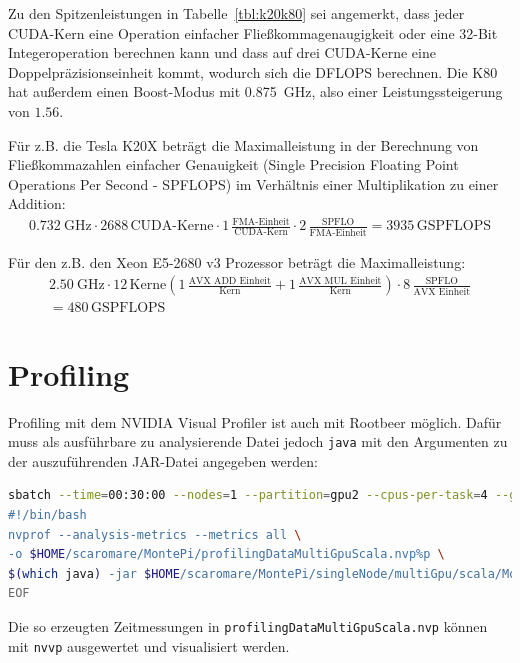 Zu den Spitzenleistungen in Tabelle~\ref{tbl:k20k80} sei angemerkt, dass jeder CUDA-Kern eine Operation einfacher Fließkommagenaugigkeit oder eine 32-Bit Integeroperation berechnen kann und dass auf drei CUDA-Kerne eine Doppelpräzisionseinheit kommt, wodurch sich die DFLOPS berechnen.
Die K80 hat außerdem einen Boost-Modus mit \SI{0.875}{\giga\hertz}, also einer Leistungssteigerung von $1.56$.

Für z.B. die Tesla K20X beträgt die Maximalleistung in der Berechnung von Fließkommazahlen einfacher Genauigkeit (Single Precision Floating Point Operations Per Second - SPFLOPS) im Verhältnis einer Multiplikation zu einer Addition:
\begin{align}
	\SI{0.732}{\giga\hertz} \cdot 2688\,\text{CUDA-Kerne} \cdot
	1\,\frac{ \text{FMA-Einheit} }{ \text{CUDA-Kern} } \cdot
	2\,\frac{ \text{SPFLO} }{ \text{FMA-Einheit} }
	= 3935\,\text{GSPFLOPS}
\end{align}

Für den z.B. den Xeon E5-2680 v3 Prozessor beträgt die Maximalleistung:
\begin{align}
	\SI{2.50}{\giga\hertz} \cdot
	12\,\text{Kerne} \left(
		1\,\frac{ \text{AVX ADD Einheit} }{ \text{Kern} } +
		1\,\frac{ \text{AVX MUL Einheit} }{ \text{Kern} }
	\right) \cdot
	8\,\frac{ \text{SPFLO} }{ \text{AVX Einheit} } \\
	= 480\,\text{GSPFLOPS}
\end{align}


\section{Profiling}

Profiling mit dem NVIDIA Visual Profiler ist auch mit Rootbeer möglich.
Dafür muss als ausführbare zu analysierende Datei jedoch \lstinline!java! mit den Argumenten zu der auszuführenden JAR-Datei angegeben werden:
\begin{lstlisting}[language=bash, caption={Erstellen der Profiling-Daten}, label={lst:nvprof}]
sbatch --time=00:30:00 --nodes=1 --partition=gpu2 --cpus-per-task=4 --gres='gpu:4' <<EOF
#!/bin/bash
nvprof --analysis-metrics --metrics all \
-o $HOME/scaromare/MontePi/profilingDataMultiGpuScala.nvp%p \
$(which java) -jar $HOME/scaromare/MontePi/singleNode/multiGpu/scala/MontePi.jar $((2*14351234510)) 2
EOF
\end{lstlisting}
Die so erzeugten Zeitmessungen in \lstinline!profilingDataMultiGpuScala.nvp! können mit \lstinline!nvvp! ausgewertet und visualisiert werden.

